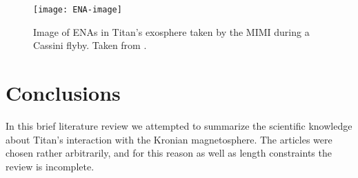 \documentclass[12pt, parskip=full*, abstract]{scrartcl}
\begin{document}

\begin{figure}[htbp]
	\centering
	\texttt{[image: ENA-image]}
	\caption{Image of ENAs in Titan's exosphere taken by the MIMI during a Cassini flyby. Taken from \textcite{titan-exosphere-interaction}.}
	\label{fig:ENA-image}
\end{figure}




 

\section{Conclusions}
In this brief literature review we attempted to summarize the scientific knowledge about Titan's interaction with the Kronian magnetosphere. The articles were chosen rather arbitrarily, and for this reason as well as length constraints the review is incomplete. 
\end{document}
